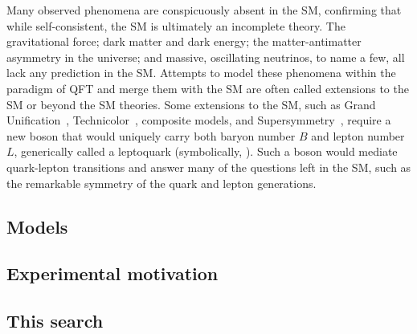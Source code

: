 Many observed phenomena are conspicuously absent in the SM, confirming that while self-consistent, the SM is ultimately an incomplete theory. The gravitational force; dark matter and dark energy; the matter-antimatter asymmetry in the universe; and massive, oscillating neutrinos, to name a few, all lack any prediction in the SM. Attempts to model these phenomena within the paradigm of QFT and merge them with the SM are often called extensions to the SM or beyond the SM theories. Some extensions to the SM, such as Grand Unification~\cite{gut1}\cite{gut2}, Technicolor~\cite{techni1}\cite{techni2}\cite{techni3}, composite models, and Supersymmetry~\cite{superstring}, require a new boson that would uniquely carry both baryon number $B$ and lepton number $L$, generically called a leptoquark (symbolically, \LQ). Such a boson would mediate quark-lepton transitions and answer many of the questions left in the SM, such as the remarkable symmetry of the quark and lepton generations.

\subsection{Models} \label{sec:LQModels}


\subsection{Experimental motivation} \label{sec:ExperimentalMotivation}


\subsection{This search} \label{sec:ThisSearch}

